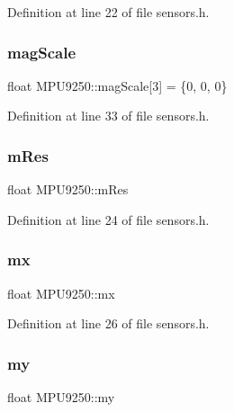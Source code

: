 Definition at line 22 of file sensors.\+h.

\mbox{\label{classMPU9250_a09f641aa48a5c7228a6ea5034e0391c3}} 
\subsubsection{\texorpdfstring{mag\+Scale}{magScale}}
{\footnotesize\ttfamily float M\+P\+U9250\+::mag\+Scale\mbox{[}3\mbox{]} = \{0, 0, 0\}}



Definition at line 33 of file sensors.\+h.

\mbox{\label{classMPU9250_a173e0594b9d3ecb6ece2b71f9f59fc50}} 
\subsubsection{\texorpdfstring{m\+Res}{mRes}}
{\footnotesize\ttfamily float M\+P\+U9250\+::m\+Res}



Definition at line 24 of file sensors.\+h.

\mbox{\label{classMPU9250_aa4cc8b2c9417304d1106bdbd988ac607}} 
\subsubsection{\texorpdfstring{mx}{mx}}
{\footnotesize\ttfamily float M\+P\+U9250\+::mx}



Definition at line 26 of file sensors.\+h.

\mbox{\label{classMPU9250_ad7cf9fe3134d24f46705881b2e002f31}} 
\subsubsection{\texorpdfstring{my}{my}}
{\footnotesize\ttfamily float M\+P\+U9250\+::my}



